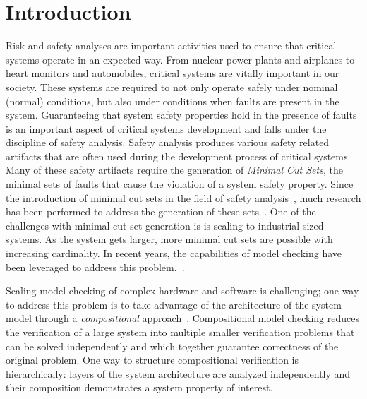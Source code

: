 \section{Introduction}
\label{sec:intro}

Risk and safety analyses are important activities used to ensure that critical systems operate in an expected way. From nuclear power plants and airplanes to heart monitors and automobiles, critical systems are vitally important in our society. These systems are required to not only operate safely under nominal (normal) conditions, but also under conditions when faults are present in the system. Guaranteeing that system safety properties hold in the presence of faults is an important aspect of critical systems development and falls under the discipline of safety analysis. Safety analysis produces various safety related artifacts that are often used during the development process of critical systems~\cite{SAE:ARP4761,SAE:ARP4754A}. Many of these safety artifacts require the generation of \textit{Minimal Cut Sets}, the minimal sets of faults that cause the violation of a system safety property. Since the introduction of minimal cut sets in the field of safety analysis~\cite{vesely1981fault}, much research has been performed to address the generation of these sets~\cite{fta:survey,rauzy1993new,historyFTA,Bozzano:2010:DSA:1951720,rausand2003system}. One of the challenges with minimal cut set generation is is scaling to industrial-sized systems. As the system gets larger, more minimal cut sets are possible with increasing cardinality. In recent years, the capabilities of model checking have been leveraged to address this problem.~\cite{bieber2002combination,schafer2003combining,fta:survey,contractBasedDesign,symbFTA,DBLP:conf/cav/BozzanoCPJKPRT15}. 

Scaling model checking of complex hardware and software is challenging;  one way to address this problem is to take advantage of the architecture of the system model through a \textit{compositional} approach~\cite{anderson1996model, clarke1989compositional,mcmillan1999verification}. Compositional model checking reduces the verification of a large system into multiple smaller verification problems that can be solved independently and which together guarantee correctness of the original problem.  One way to structure compositional verification is hierarchically: layers of the system architecture are analyzed independently and their composition demonstrates a system property of interest.

